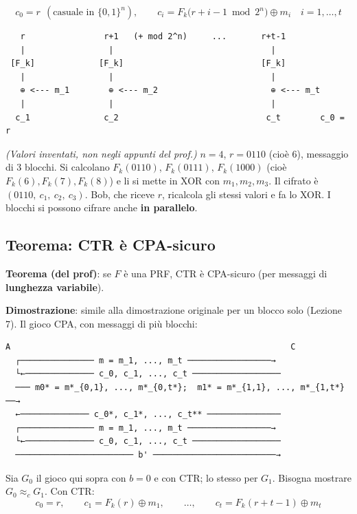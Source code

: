 \[
c_0 = r \ \ (\text{casuale in } \{0,1\}^n), \qquad c_i = F_k\big(r + i - 1 \bmod 2^n\big) \oplus m_i \quad i = 1, \dots, t
\]

\begin{verbatim}
   r                r+1   (+ mod 2^n)     ...       r+t-1
   |                 |                                |
 [F_k]             [F_k]                            [F_k]
   |                 |                                |
   ⊕ <--- m_1        ⊕ <--- m_2                       ⊕ <--- m_t
   |                 |                                |
  c_1               c_2                              c_t        c_0 = r
\end{verbatim}

\begin{esempio}
\emph{(Valori inventati, non negli appunti del prof.)} \(n = 4\), \(r = 0110\) (cioè 6), messaggio di 3 blocchi. Si calcolano \(F_k(0110)\), \(F_k(0111)\), \(F_k(1000)\) (cioè \(F_k(6), F_k(7), F_k(8)\)) e li si mette in XOR con \(m_1, m_2, m_3\). Il cifrato è \((0110,\ c_1,\ c_2,\ c_3)\). Bob, che riceve \(r\), ricalcola gli stessi valori e fa lo XOR. I blocchi si possono cifrare anche \textbf{in parallelo}.
\end{esempio}

\subsection{Teorema: CTR è CPA-sicuro}

\textbf{Teorema (del prof)}: se \(F\) è una PRF, CTR è CPA-sicuro (per messaggi di \textbf{lunghezza variabile}).

\textbf{Dimostrazione}: simile alla dimostrazione originale per un blocco solo (Lezione 7). Il gioco CPA, con messaggi di più blocchi:

\begin{verbatim}
A                                                         C
  ┌─────────────── m = m_1, ..., m_t ─────────────────→
  └←────────────── c_0, c_1, ..., c_t ──────────────────
  ─── m0* = m*_{0,1}, ..., m*_{0,t*};  m1* = m*_{1,1}, ..., m*_{1,t*} ──→
  ←────────────── c_0*, c_1*, ..., c_t** ───────────────
  ┌─────────────── m = m_1, ..., m_t ─────────────────→
  └←────────────── c_0, c_1, ..., c_t ──────────────────
  ──────────────────────── b' ─────────────────────────→
\end{verbatim}

Sia \(G_0\) il gioco qui sopra con \(b = 0\) e con CTR; lo stesso per \(G_1\). Bisogna mostrare \(G_0 \approx_c G_1\). Con CTR:
\[
c_0 = r, \qquad c_1 = F_k(r) \oplus m_1, \qquad \dots, \qquad c_t = F_k(r + t - 1) \oplus m_t
\]

